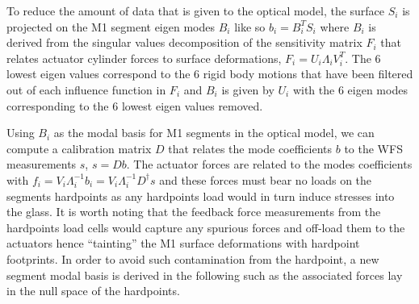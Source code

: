 \documentclass{gmto}
\begin{document}
To reduce the amount of data that is given to the optical model, the surface
$S_i$ is projected on the M1 segment eigen modes $B_i$ like so $b_i = B_i^TS_i$
where $B_i$ is derived from the singular values decomposition of the sensitivity
matrix $F_i$ that relates actuator cylinder forces to surface deformations, $F_i
= U_i \Lambda_i V_i^T$.
The 6 lowest eigen values correspond to the 6 rigid body motions that have been
filtered out of each influence function in $F_i$ and $B_i$ is given by $U_i$
with the 6 eigen modes corresponding to the 6 lowest eigen values removed.

Using $B_i$ as the modal basis for M1 segments in the optical model, we can compute
a calibration matrix $D$ that relates the mode coefficients $b$ to the WFS
measurements $s$, $s=Db$.
The actuator forces are related to the modes coefficients with $f_i =
V_i\Lambda_i^{-1}b_i = V_i\Lambda_i^{-1}D^\dagger s$ and these forces must bear
no loads on the segments hardpoints as any hardpoints load would in turn induce
stresses into the glass.
It is worth noting that the feedback force measurements from the hardpoints load cells
would capture any spurious forces and off-load them to the actuators hence
``tainting'' the M1 surface deformations with hardpoint footprints.
In order to avoid such contamination from the hardpoint, a new segment modal
basis is derived in the following such as the associated forces lay in the null
space of the hardpoints.
\end{document}
